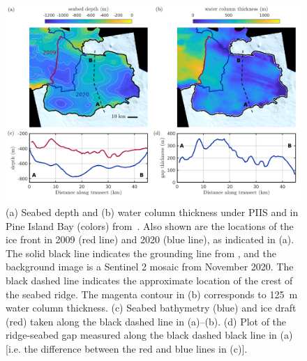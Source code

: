 \documentclass[draft]{agujournal2019}
\begin{document}
\begin{figure}
    \centering
    \includegraphics[width = \textwidth]{../make_figures/plots/figure1.png}
    \caption{(a) Seabed depth and (b) water column thickness under PIIS and in Pine Island Bay (colors) from~. Also shown are the locations of the ice front in 2009 (red line) and 2020 (blue line), as indicated in (a).  The solid black line indicates the grounding line from , and the background image is a Sentinel 2 mosaic from November 2020. The black dashed line indicates the approximate location of the crest of the seabed ridge. The magenta contour in (b) corresponds to 125~m  water column thickness. (c) Seabed bathymetry (blue) and ice draft (red) taken along the black dashed line in (a)--(b). (d) Plot of the ridge-seabed gap measured along the black dashed black line in (a) [i.e. the difference between the red and blue lines in (c)]. }
    \label{fig:figure1}
\end{figure}
\end{document}
